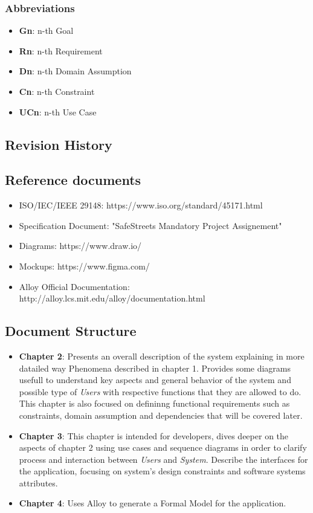 \documentclass{article}
\begin{document}
\subsubsection{Abbreviations}
\begin{itemize}
    \item \textbf{Gn}: n-th Goal
    \item \textbf{Rn}: n-th Requirement 
    \item \textbf{Dn}: n-th Domain Assumption
    \item \textbf{Cn}: n-th Constraint 
    \item \textbf{UCn}: n-th Use Case
\end{itemize}

\subsection{Revision History}

\subsection{Reference documents}
\begin{itemize}
    \item ISO/IEC/IEEE 29148: https://www.iso.org/standard/45171.html
    \item Specification Document: "SafeStreets Mandatory Project Assignement"
    \item Diagrams: https://www.draw.io/
    \item Mockups: https://www.figma.com/
    \item Alloy Official Documentation: http://alloy.lcs.mit.edu/alloy/documentation.html
\end{itemize}

\subsection{Document Structure}
\begin{itemize}
    \item \textbf{Chapter 2}: Presents an overall description of the system explaining in more datailed 
    way Phenomena described in chapter 1. Provides some diagrams usefull to understand key aspects and 
    general behavior of the system and possible type of \textit{Users} with respective functions that they are allowed to do. 
    This chapter is also focused on defininng functional requirements such
    as constraints, domain assumption and dependencies that will be covered later.    
    \item \textbf{Chapter 3}: This chapter is intended for developers, dives deeper on the aspects of chapter 2 using 
    use cases and sequence diagrams in order to clarify process and interaction between \textit{Users} and \textit{System}. 
    Describe the interfaces for the application, focusing on system's design constraints and software systems attributes.  
    \item \textbf{Chapter 4}: Uses Alloy to generate a Formal Model for the application.
\end{itemize}
\end{document}
